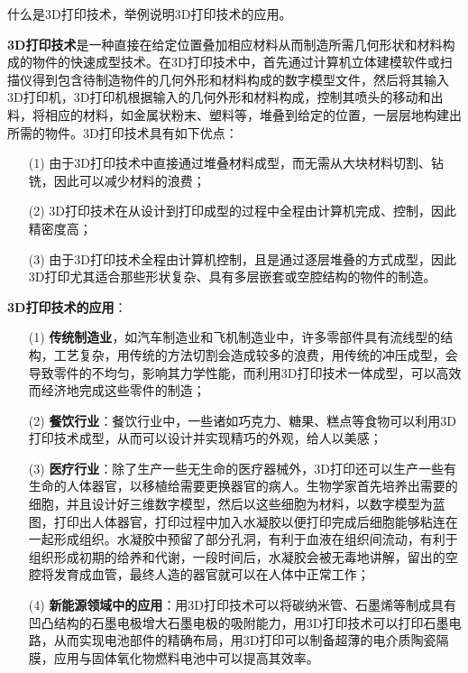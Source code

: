\documentclass{assignment}
\begin{document}
\begin{ti}
    什么是3D打印技术，举例说明3D打印技术的应用。
\end{ti}
\begin{da}
    \textbf{3D打印技术}是一种直接在给定位置叠加相应材料从而制造所需几何形状和材料构成的物件的快速成型技术。在3D打印技术中，首先通过计算机立体建模软件或扫描仪得到包含待制造物件的几何外形和材料构成的数字模型文件，然后将其输入3D打印机，3D打印机根据输入的几何外形和材料构成，控制其喷头的移动和出料，将相应的材料，如金属状粉末、塑料等，堆叠到给定的位置，一层层地构建出所需的物件。3D打印技术具有如下优点：
    \begin{itemize}
        \item[(1)] 由于3D打印技术中直接通过堆叠材料成型，而无需从大块材料切割、钻铣，因此可以减少材料的浪费；
        \item[(2)] 3D打印技术在从设计到打印成型的过程中全程由计算机完成、控制，因此精密度高；
        \item[(3)] 由于3D打印技术全程由计算机控制，且是通过逐层堆叠的方式成型，因此3D打印尤其适合那些形状复杂、具有多层嵌套或空腔结构的物件的制造。
    \end{itemize}

    \textbf{3D打印技术的应用}：
    \begin{itemize}
        \item[(1)] \textbf{传统制造业}，如汽车制造业和飞机制造业中，许多零部件具有流线型的结构，工艺复杂，用传统的方法切割会造成较多的浪费，用传统的冲压成型，会导致零件的不均匀，影响其力学性能，而利用3D打印技术一体成型，可以高效而经济地完成这些零件的制造；
        \item[(2)] \textbf{餐饮行业}：餐饮行业中，一些诸如巧克力、糖果、糕点等食物可以利用3D打印技术成型，从而可以设计并实现精巧的外观，给人以美感；
        \item[(3)] \textbf{医疗行业}：除了生产一些无生命的医疗器械外，3D打印还可以生产一些有生命的人体器官，以移植给需要更换器官的病人\cite{kang20163d}。生物学家首先培养出需要的细胞，并且设计好三维数字模型，然后以这些细胞为材料，以数字模型为蓝图，打印出人体器官，打印过程中加入水凝胶以便打印完成后细胞能够粘连在一起形成组织。水凝胶中预留了部分孔洞，有利于血液在组织间流动，有利于组织形成初期的给养和代谢，一段时间后，水凝胶会被无毒地讲解，留出的空腔将发育成血管，最终人造的器官就可以在人体中正常工作；
        \item[(4)] \textbf{新能源领域中的应用}：用3D打印技术可以将碳纳米管、石墨烯等制成具有凹凸结构的石墨电极增大石墨电极的吸附能力，用3D打印技术可以打印石墨电路，从而实现电池部件的精确布局，用3D打印可以制备超薄的电介质陶瓷隔膜，应用与固体氧化物燃料电池中可以提高其效率。
    \end{itemize}
\end{da}
\end{document}
